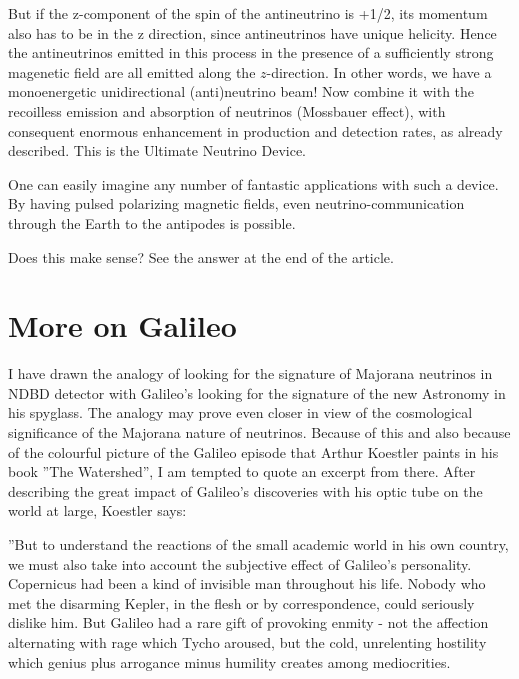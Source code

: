 But if the z-component of the spin of the antineutrino is +1/2, its momentum also has
to be in the z direction, since antineutrinos have unique helicity. Hence the antineutrinos
emitted in this process in the presence of a sufficiently strong magenetic field are all emitted
along the $z$-direction. In other words, we have a monoenergetic unidirectional (anti)neutrino
beam! Now combine it with the recoilless emission and absorption of neutrinos (Mossbauer
effect), with consequent enormous enhancement in production and detection rates, as already
described. This is the Ultimate Neutrino Device.

One can easily imagine any number of fantastic applications with such a device. By
having pulsed polarizing magnetic fields, even neutrino-communication through the Earth
to the antipodes is possible.

Does this make sense? See the answer at the end of the article.

\section*{More on Galileo}

I have drawn the analogy of looking for the signature of Majorana neutrinos in NDBD
detector with Galileo’s looking for the signature of the new Astronomy in his spyglass. The
analogy may prove even closer in view of the cosmological significance of the Majorana
nature of neutrinos. Because of this and also because of the colourful picture of the Galileo
episode that Arthur Koestler paints in his book ”The Watershed”, I am tempted to quote
an excerpt from there. After describing the great impact of Galileo’s discoveries with his
optic tube on the world at large, Koestler says:

”But to understand the reactions of the small academic world in his own country, we
must also take into account the subjective effect of Galileo’s personality. Copernicus had
been a kind of invisible man throughout his life. Nobody who met the disarming Kepler,
in the flesh or by correspondence, could seriously dislike him. But Galileo had a rare gift
of provoking enmity - not the affection alternating with rage which Tycho aroused, but
the cold, unrelenting hostility which genius plus arrogance minus humility creates among
mediocrities.

